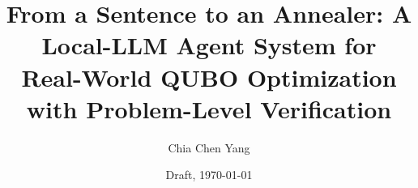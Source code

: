 \documentclass[11pt]{article}
\title{From a Sentence to an Annealer: A Local-LLM Agent System for\\
Real-World QUBO Optimization with Problem-Level Verification}
\author{Chia Chen Yang}
\date{Draft, \today}
\begin{document}
\maketitle

\begin{abstract}

\end{abstract}












\clearpage
\appendix

\end{document}
